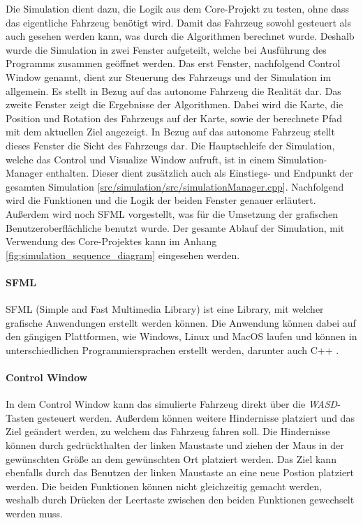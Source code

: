 Die Simulation dient dazu, die Logik aus dem Core-Projekt zu testen, ohne dass das eigentliche Fahrzeug benötigt wird. Damit das Fahrzeug sowohl gesteuert als auch gesehen werden kann, was durch die Algorithmen berechnet wurde. Deshalb wurde die Simulation in zwei Fenster aufgeteilt, welche bei Ausführung des Programms zusammen geöffnet werden. Das erst Fenster, nachfolgend Control Window genannt, dient zur Steuerung des Fahrzeugs und der Simulation im allgemein. Es stellt in Bezug auf das autonome Fahrzeug die Realität dar. Das zweite Fenster zeigt die Ergebnisse der Algorithmen. Dabei wird die Karte, die Position und Rotation des Fahrzeugs auf der Karte, sowie der berechnete Pfad mit dem aktuellen Ziel angezeigt. In Bezug auf das autonome Fahrzeug stellt dieses Fenster die Sicht des Fahrzeugs dar. Die Hauptschleife der Simulation, welche das Control und Visualize Window aufruft, ist in einem Simulation-Manager enthalten. Dieser dient zusätzlich auch als Einstiegs- und Endpunkt der gesamten Simulation [\href{https://github.com/Jundy0/Studienarbeit/blob/main/src/simulation/src/simulationManager.cpp}{src/simulation/src/simulationManager.cpp}]. Nachfolgend wird die Funktionen und die Logik der beiden Fenster genauer erläutert. Außerdem wird noch SFML vorgestellt, was für die Umsetzung der grafischen Benutzeroberflächliche benutzt wurde. Der gesamte Ablauf der Simulation, mit Verwendung des Core-Projektes kann im Anhang \ref{fig:simulation_sequence_diagram} eingesehen werden. 

\paragraph{SFML} \mbox{}

SFML (Simple and Fast Multimedia Library) ist eine Library, mit welcher grafische Anwendungen erstellt werden können. Die Anwendung können dabei auf den gängigen Plattformen, wie Windows, Linux und MacOS laufen und können in unterschiedlichen Programmiersprachen erstellt werden, darunter auch C++ \cite{sfml}. 

\paragraph{Control Window} \mbox{}

In dem Control Window kann das simulierte Fahrzeug direkt über die \textit{WASD}-Tasten gesteuert werden. Außerdem können weitere Hindernisse platziert und das Ziel geändert werden, zu welchem das Fahrzeug fahren soll. Die Hindernisse können durch gedrückthalten der linken Maustaste und ziehen der Maus in der gewünschten Größe an dem gewünschten Ort platziert werden. Das Ziel kann ebenfalls durch das Benutzen der linken Maustaste an eine neue Postion platziert werden. Die beiden Funktionen können nicht gleichzeitig gemacht werden, weshalb durch Drücken der Leertaste zwischen den beiden Funktionen gewechselt werden muss. 

